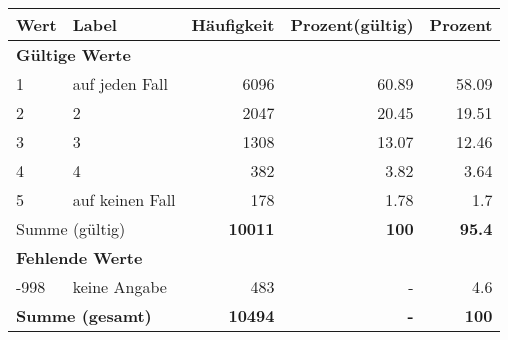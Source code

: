      \begin{longtable}{lXrrr}
     \toprule
     \textbf{Wert} & \textbf{Label} & \textbf{Häufigkeit} & \textbf{Prozent(gültig)} & \textbf{Prozent} \\
     \endhead
     \midrule
     \multicolumn{5}{l}{\textbf{Gültige Werte}}\\

     1 &
     \multicolumn{1}{X}{ auf jeden Fall   } &


       \num{6096} &
       \num[round-mode=places,round-precision=2]{60,89} &
         \num[round-mode=places,round-precision=2]{58,09} \\

     2 &
     \multicolumn{1}{X}{ 2   } &


       \num{2047} &
       \num[round-mode=places,round-precision=2]{20,45} &
         \num[round-mode=places,round-precision=2]{19,51} \\

     3 &
     \multicolumn{1}{X}{ 3   } &


       \num{1308} &
       \num[round-mode=places,round-precision=2]{13,07} &
         \num[round-mode=places,round-precision=2]{12,46} \\

     4 &
     \multicolumn{1}{X}{ 4   } &


       \num{382} &
       \num[round-mode=places,round-precision=2]{3,82} &
         \num[round-mode=places,round-precision=2]{3,64} \\

     5 &
     \multicolumn{1}{X}{ auf keinen Fall   } &


       \num{178} &
       \num[round-mode=places,round-precision=2]{1,78} &
         \num[round-mode=places,round-precision=2]{1,7} \\
     \midrule
     \multicolumn{2}{l}{Summe (gültig)} &
       \textbf{\num{10011}} &
     \textbf{100} &
       \textbf{\num[round-mode=places,round-precision=2]{95,4}} \\
     \multicolumn{5}{l}{\textbf{Fehlende Werte}}\\
       -998 &
       keine Angabe &
         \num{483} &
        - &
         \num[round-mode=places,round-precision=2]{4,6} \\
     \midrule
     \multicolumn{2}{l}{\textbf{Summe (gesamt)}} &
          \textbf{\num{10494}} &
        \textbf{-} &
        \textbf{100} \\
     \bottomrule
     \end{longtable}
     
